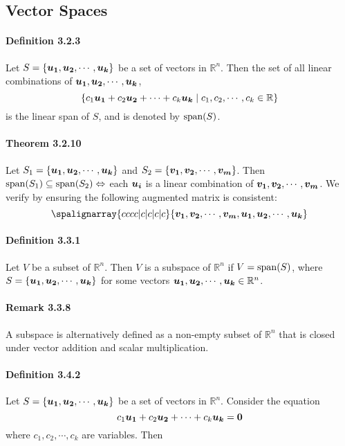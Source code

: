 \documentclass[a4paper]{article}
\newcommand{\R}{\mathbb{R}}
\begin{document}
\begin{multicols*}{3}
  \section*{Vector Spaces}
    \paragraph{Definition 3.2.3} Let $S = \vset{\u[1], \u[2], \cdots, \u[k]}$ be a set of vectors in $\R^n$. Then the set of all linear combinations of $\u[1], \u[2], \cdots, \u[k]$,
      \begin{equation*}
        \{ c_1 \u[1] + c_2 \u[2] + \cdots + c_k \u[k] \;\vert\; c_1, c_2, \cdots, c_k \in \R \}
      \end{equation*}
      is the linear span of $S$, and is denoted by $\spn{S}$.
    \paragraph{Theorem 3.2.10} Let $S_1 = \vset{\u[1], \u[2], \cdots, \u[k]}$ and $S_2 = \vset{\v[1], \v[2], \cdots, \v[m]}$. Then $\spn{S_1} \subseteq \spn{S_2} \Leftrightarrow$ each $\u[i]$ is a linear combination of $\v[1], \v[2], \cdots, \v[m]$. We verify by ensuring the following augmented matrix is consistent:
    \begin{equation*}
      \spalignarray{cccc|c|c|c|c}{\v[1], \v[2], \cdots, \v[m], \u[1], \u[2], \cdots, \u[k]}
    \end{equation*}
    \paragraph{Definition 3.3.1} Let $V$ be a subset of $\R^n$. Then $V$ is a subspace of $\R^n$ if $V = \spn{S}$, where $S = \vset{\u[1], \u[2], \cdots, \u[k]}$ for some vectors $\u[1], \u[2], \cdots, \u[k] \in \R^n$.
    \paragraph{Remark 3.3.8} A subspace is alternatively defined as a non-empty subset of $\R^n$ that is closed under vector addition and scalar multiplication.
    \paragraph{Definition 3.4.2} Let $S = \vset{\u[1], \u[2], \cdots, \u[k]}$ be a set of vectors in $\R^n$. Consider the equation
      \begin{equation*}
        c_1 \u[1] + c_2 \u[2] + \cdots + c_k \u[k] = \vz
      \end{equation*}
      where $c_1, c_2, \cdots, c_k$ are variables. Then

\end{multicols*}
\end{document}
